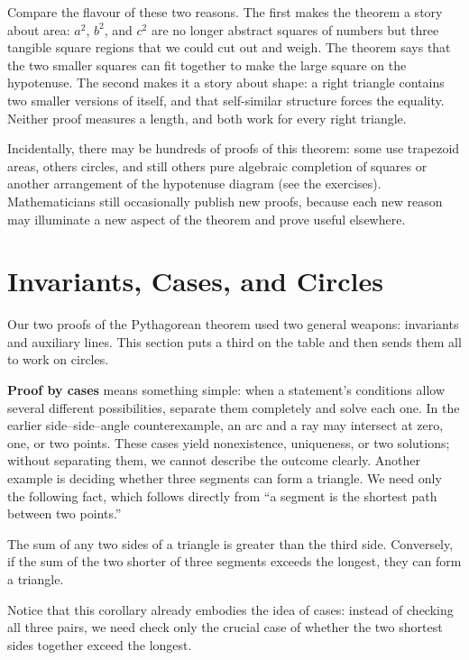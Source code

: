 Compare the flavour of these two reasons. The first makes the theorem a story about area: $a^2$, $b^2$, and $c^2$ are no longer abstract squares of numbers but three tangible square regions that we could cut out and weigh. The theorem says that the two smaller squares can fit together to make the large square on the hypotenuse. The second makes it a story about shape: a right triangle contains two smaller versions of itself, and that self-similar structure forces the equality. Neither proof measures a length, and both work for every right triangle.

Incidentally, there may be hundreds of proofs of this theorem: some use trapezoid areas, others circles, and still others pure algebraic completion of squares or another arrangement of the hypotenuse diagram (see the exercises). Mathematicians still occasionally publish new proofs, because each new reason may illuminate a new aspect of the theorem and prove useful elsewhere.

\section{Invariants, Cases, and Circles}

Our two proofs of the Pythagorean theorem used two general weapons: invariants and auxiliary lines. This section puts a third on the table and then sends them all to work on circles.

\textbf{Proof by cases} means something simple: when a statement's conditions allow several different possibilities, separate them completely and solve each one. In the earlier side--side--angle counterexample, an arc and a ray may intersect at zero, one, or two points. These cases yield nonexistence, uniqueness, or two solutions; without separating them, we cannot describe the outcome clearly. Another example is deciding whether three segments can form a triangle. We need only the following fact, which follows directly from ``a segment is the shortest path between two points.''

\begin{tuilun}
The sum of any two sides of a triangle is greater than the third side. Conversely, if the sum of the two shorter of three segments exceeds the longest, they can form a triangle.
\end{tuilun}

Notice that this corollary already embodies the idea of cases: instead of checking all three pairs, we need check only the crucial case of whether the two shortest sides together exceed the longest.

